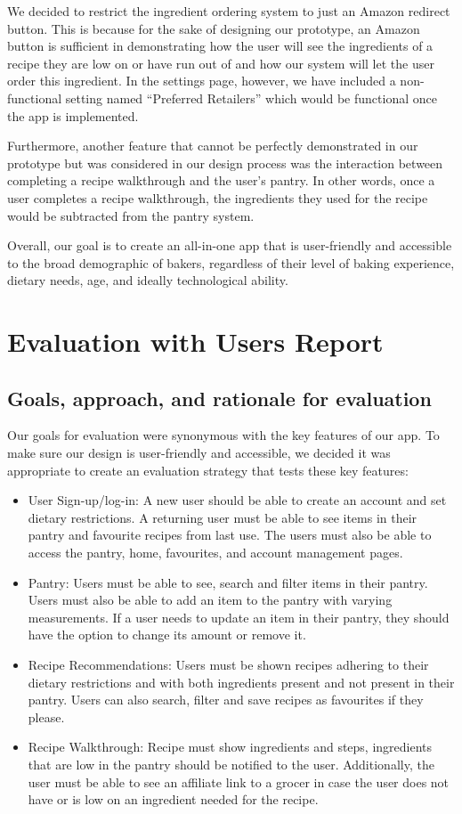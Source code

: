 \documentclass[manuscript, screen, nonacm]{acmart}
\begin{document}
We decided to restrict the ingredient ordering system to just an Amazon redirect button. This is because for the sake of designing our prototype, an Amazon button is sufficient in demonstrating how the user will see the ingredients of a recipe they are low on or have run out of and how our system will let the user order this ingredient. In the settings page, however, we have included a non-functional setting named “Preferred Retailers” which would be functional once the app is implemented.

Furthermore, another feature that cannot be perfectly demonstrated in our prototype but was considered in our design process was the interaction between completing a recipe walkthrough and the user’s pantry. In other words, once a user completes a recipe walkthrough, the ingredients they used for the recipe would be subtracted from the pantry system.

Overall, our goal is to create an all-in-one app that is user-friendly and accessible to the broad demographic of bakers, regardless of their level of baking experience, dietary needs, age, and ideally technological ability.


\section{Evaluation with Users Report}
\subsection{Goals, approach, and rationale for evaluation}
Our goals for evaluation were synonymous with the key features of our app. To make sure our design is user-friendly and accessible, we decided it was appropriate to create an evaluation strategy that tests these key features:
\begin{itemize}
    \item User Sign-up/log-in: A new user should be able to create an account and set dietary restrictions. A returning user must be able to see items in their pantry and favourite recipes from last use. The users must also be able to access the pantry, home, favourites, and account management pages.
    \item Pantry: Users must be able to see, search and filter items in their pantry. Users must also be able to add an item to the pantry with varying measurements. If a user needs to update an item in their pantry, they should have the option to change its amount or remove it.
    \item Recipe Recommendations: Users must be shown recipes adhering to their dietary restrictions and with both ingredients present and not present in their pantry. Users can also search, filter and save recipes as favourites if they please.
    \item Recipe Walkthrough: Recipe must show ingredients and steps, ingredients that are low in the pantry should be notified to the user. Additionally, the user must be able to see an affiliate link to a grocer in case the user does not have or is low on an ingredient needed for the recipe.
\end{itemize}
\end{document}
